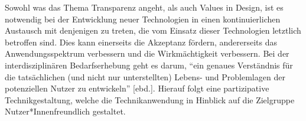 Sowohl was das Thema Transparenz angeht, als auch Values in Design, ist es notwendig bei der Entwicklung neuer Technologien in einen kontinuierlichen Austausch mit denjenigen zu treten, die vom Einsatz dieser Technologien letztlich betroffen sind. Dies kann einerseits die Akzeptanz fördern, andererseits das Anwendungsspektrum verbessern und die Wirkmächtigkeit verbessern.
Bei der interdisziplinären Bedarfserhebung geht es darum, “ein  genaues  Verständnis  für  die  tatsächlichen  (und  nicht  nur  unterstellten)  Lebens-  und  Problemlagen  der  potenziellen  Nutzer  zu  entwickeln” [ebd.]. Hierauf folgt eine partizipative Technikgestaltung, welche die Technikanwendung in Hinblick auf die Zielgruppe Nutzer*Innenfreundlich gestaltet.

